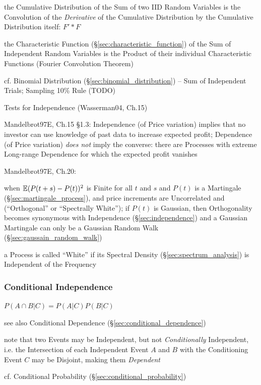 the Cumulative Distribution of the Sum of two IID Random Variables is the
Convolution of the \emph{Derivative} of the Cumulative Distribution by the
Cumulative Distribution itself: $F' * F$

the Characteristic Function (\S\ref{sec:characteristic_function}) of the Sum of
Independent Random Variables is the Product of their individual Characteristic
Functions (Fourier Convolution Theorem)

cf. Binomial Distribution (\S\ref{sec:binomial_distribution}) -- Sum of
Independent Trials; Sampling 10\% Rule (TODO)

Tests for Independence (Wasserman04, Ch.15) %

Mandelbrot97E, Ch.15 \S 1.3: Independence (of Price variation) implies that no
investor can use knowledge of past data to increase expected profit; Dependence
(of Price variation) \emph{does not} imply the converse: there are Processes
with extreme Long-range Dependence for which the expected profit vanishes

Mandelbrot97E, Ch.20:

when $\mathbb{E}(P(t + s) - P(t))^2$ is Finite for all $t$ and $s$ and $P(t)$ is a
Martingale (\S\ref{sec:martingale_process}), and price increments are
Uncorrelated and (``Orthogonal'' or ``Spectrally White'');
if $P(t)$ is Gaussian, then Orthogonality becomes synonymous with Independence
(\S\ref{sec:independence}) and a Gaussian Martingale can only be a Gaussian
Random Walk (\S\ref{sec:gaussain_random_walk})

a Process is called ``White'' if its Spectral Density
(\S\ref{sec:spectrum_analysis}) is Independent of the Frequency



\subsubsection{Conditional Independence}\label{sec:conditional_independence}

$P(A \cap B | C) = P(A|C)P(B|C)$

see also Conditional Dependence (\S\ref{sec:conditional_dependence})

note that two Events may be Independent, but not \emph{Conditionally}
Independent, i.e. the Intersection of each Independent Event $A$ and $B$ with
the Conditioning Event $C$ may be Disjoint, making them \emph{Dependent}

\fist cf. Conditional Probability (\S\ref{sec:conditional_probability})

